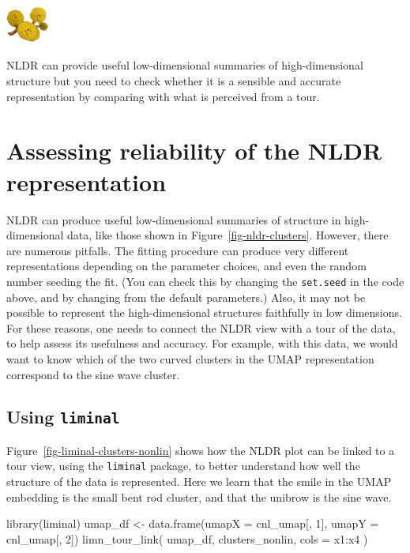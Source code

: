 \documentclass[
  letterpaper,
]{krantz}
\newenvironment{Shaded}{\begin{snugshade}}{\end{snugshade}}
\newcommand{\AttributeTok}[1]{\textcolor[rgb]{0.40,0.45,0.13}{#1}}
\newcommand{\DecValTok}[1]{\textcolor[rgb]{0.68,0.00,0.00}{#1}}
\newcommand{\FunctionTok}[1]{\textcolor[rgb]{0.28,0.35,0.67}{#1}}
\newcommand{\NormalTok}[1]{\textcolor[rgb]{0.00,0.23,0.31}{#1}}
\newcommand{\OtherTok}[1]{\textcolor[rgb]{0.00,0.23,0.31}{#1}}
\newcommand{\SpecialCharTok}[1]{\textcolor[rgb]{0.37,0.37,0.37}{#1}}
\newcommand{\infobox}[1]{%
\noindent\colorbox{info!30}{%
\begin{minipage}{0.98\linewidth}%
    \centering%
    \begin{minipage}[c]{0.15\linewidth} %
      \includegraphics[width=1.5cm]{images/mulga-flowers2.png} %
    \end{minipage}%
    \hfill %
    \begin{minipage}[c]{0.8\linewidth} %
      \bigskip%
      \textsf{#1}%
      \bigskip%
    \end{minipage}%
    \hspace*{3mm}%
  \end{minipage}%
}%
}
\begin{document}
\infobox{NLDR can provide useful low-dimensional summaries of high-dimensional structure but you need to check whether it is a sensible and accurate representation by comparing with what is perceived from a tour.}

\section{Assessing reliability of the NLDR
representation}\label{assessing-reliability-of-the-nldr-representation}

NLDR can produce useful low-dimensional summaries of structure in
high-dimensional data, like those shown in
Figure~\ref{fig-nldr-clusters}. However, there are numerous pitfalls.
The fitting procedure can produce very different representations
depending on the parameter choices, and even the random number seeding
the fit. (You can check this by changing the \texttt{set.seed} in the
code above, and by changing from the default parameters.) Also, it may
not be possible to represent the high-dimensional structures faithfully
in low dimensions. For these reasons, one needs to connect the NLDR view
with a tour of the data, to help assess its usefulness and accuracy. For
example, with this data, we would want to know which of the two curved
clusters in the UMAP representation correspond to the sine wave cluster.

\subsection{\texorpdfstring{Using
\texttt{liminal}}{Using liminal}}\label{using-liminal}


Figure~\ref{fig-liminal-clusters-nonlin} shows how the NLDR plot can be
linked to a tour view, using the \texttt{liminal} package, to better
understand how well the structure of the data is represented. Here we
learn that the smile in the UMAP embedding is the small bent rod
cluster, and that the unibrow is the sine wave.

\begin{Shaded}
\begin{Highlighting}[]
\FunctionTok{library}\NormalTok{(liminal)}
\NormalTok{umap\_df }\OtherTok{\textless{}{-}} \FunctionTok{data.frame}\NormalTok{(}\AttributeTok{umapX =}\NormalTok{ cnl\_umap[, }\DecValTok{1}\NormalTok{],}
                      \AttributeTok{umapY =}\NormalTok{ cnl\_umap[, }\DecValTok{2}\NormalTok{])}
\FunctionTok{limn\_tour\_link}\NormalTok{(}
\NormalTok{  umap\_df,}
\NormalTok{  clusters\_nonlin,}
  \AttributeTok{cols =}\NormalTok{ x1}\SpecialCharTok{:}\NormalTok{x4}
\NormalTok{)}
\end{Highlighting}
\end{Shaded}
\end{document}
